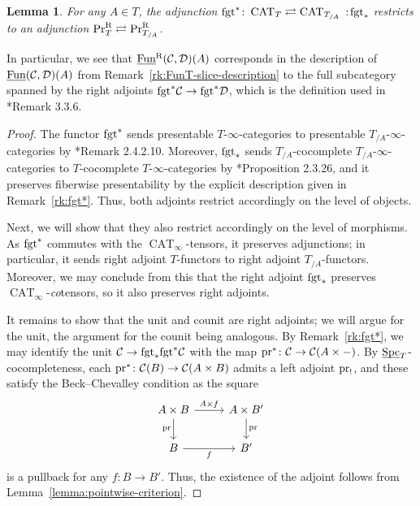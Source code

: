 \documentclass[reqno]{memo-l}
\theoremstyle{mythm}
\newtheorem{lemma}[thm]{Lemma}
\theoremstyle{definition}
\numberwithin{equation}{section}
\newcommand{\Cc}{{\mathcal{C}}}
\newcommand{\Dd}{{\mathcal{D}}}
\DeclareMathOperator{\Spc}{Spc}
\DeclareMathOperator{\CAT}{CAT}
\newcommand{\PrR}{\textup{Pr}^{\textup{R}}}
\newcommand{\Fun}{{\textup{Fun}}}
\newcommand{\pr}{\textup{pr}}
\newcommand{\fgt}{\textup{fgt}}
\newcommand{\ulhelper}[2]{\underline{\setbox0=\hbox{$#1#2$}\dp0=0.4pt \box0\relax}}
\newcommand{\ul}[1]{{\mathpalette\ulhelper{#1}}\hbox{\rule[-2pt]{0pt}{0pt}}}
\newcommand\noloc{%
	\nobreak
	\mspace{6mu plus 1mu}
	{:}
	\nonscript\mkern-\thinmuskip
	\mathpunct{}
	\mspace{2mu}
}
\begin{document}
\begin{lemma}\label{lemma:PrR-restrict}
    For any $A\in T$, the adjunction $\fgt^*\colon\CAT_{T}\rightleftarrows\CAT_{T_{/A}}\noloc\fgt_*$ restricts to an adjunction $\smash{\PrR_{T}}\rightleftarrows\PrR_{T_{/A}}$.
\end{lemma}

In particular, we see that $\ul\Fun^\text{R}(\Cc,\Dd)(A)$ corresponds in the description of $\ul\Fun(\Cc,\Dd)(A)$ from Remark~\ref{rk:FunT-slice-description} to the full subcategory spanned by the right adjoints $\fgt^*\Cc\to\fgt^*\Dd$, which is the definition used in \cite{martiniwolf2021limits}*{Remark 3.3.6}.

\begin{proof}
    The functor $\fgt^*$ sends presentable $T$-$\infty$-categories to presentable $T_{/A}$-$\infty$-categories by \cite{martiniwolf2022presentable}*{Remark 2.4.2.10}. Moreover, $\fgt_*$ sends $T_{/A}$-cocomplete $T_{/A}$-$\infty$-categories to $T$-cocomplete $T$-$\infty$-categories by \cite{CLL_Global}*{Proposition 2.3.26}, and it preserves fiberwise presentability by the explicit description given in Remark~\ref{rk:fgt*}. Thus, both adjoints restrict accordingly on the level of objects.
    
    Next, we will show that they also restrict accordingly on the level of morphisms. As $\fgt^*$ commutes with the $\CAT_\infty$-tensors, it preserves adjunctions; in particular, it sends right adjoint $T$-functors to right adjoint $T_{/A}$-functors. Moreover, we may conclude from this that the right adjoint $\fgt_*$ preserves $\CAT_\infty$-\emph{co}tensors, so it also preserves right adjoints. 

    It remains to show that the unit and counit are right adjoints; we will argue for the unit, the argument for the counit being analogous. By Remark~\ref{rk:fgt*}, we may identify the unit $\Cc\to\fgt_*\fgt^*\Cc$ with the map $\pr^*\colon\Cc\to\Cc(A\times{-})$. By $\ul\Spc_T$-cocompleteness, each $\pr^*\colon\Cc(B)\to\Cc(A\times B)$ admits a left adjoint $\pr_!$, and these satisfy the Beck--Chevalley condition as the square
    \[
        \begin{tikzcd}
            A\times B\arrow[d,"\pr"']\arrow[r,"A\times f"] &[.25em] A\times B'\arrow[d,"\pr"]\\
            B\arrow[r,"f"'] & B'
        \end{tikzcd}
    \]
    is a pullback for any $f\colon B\to B'$. Thus, the existence of the adjoint follows from Lemma~\ref{lemma:pointwise-criterion}.
\end{proof}
\end{document}
